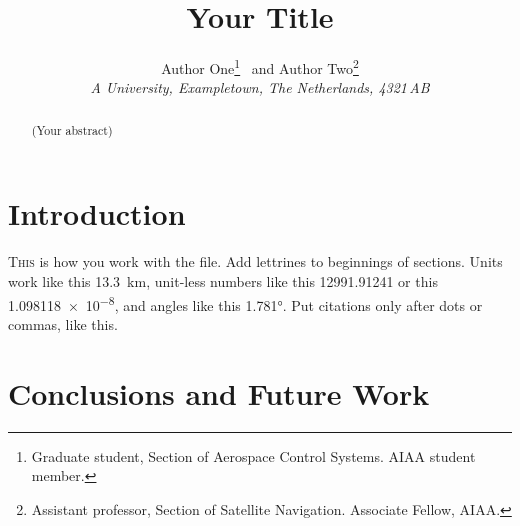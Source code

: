 \documentclass[%
]{aiaa-tc}
\title{Your Title}
\author{
 Author One\thanks{%
     Graduate student, Section of Aerospace Control Systems. AIAA student member.%
 }
 \ and Author Two\thanks{Assistant professor, Section of Satellite Navigation. Associate
     Fellow, AIAA.}\\
 {\normalsize\itshape
  A University, Exampletown, The Netherlands, 4321\,AB}
}
\begin{document}



\maketitle

\begin{abstract}
    (Your abstract)
\end{abstract}

\printnomenclature

\section{Introduction}

\lettrine{T}{\textsc{his}} is how you work with the file. Add lettrines to
beginnings of sections. Units work like this \SI{13.3}{km}, unit-less numbers
like this \num{12991.91241} or this \num{1.098118e-8}, and angles like this
\ang{1.781}. Put citations only after dots or commas, like
this.\cite{wirin:90cp}


\section{Conclusions and Future Work}
\end{document}
